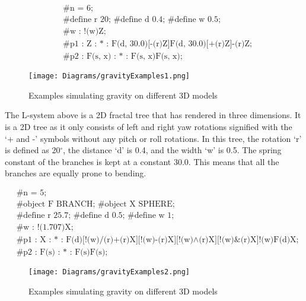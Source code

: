 \begin{singlespace}
\begin{equation}
\begin{aligned}
	&\textrm{\#n = 6;} \\
	&\textrm{\#define r 20; \#define d 0.4; \#define w 0.5;}\\
	&\textrm{\#w : !(w)Z;}\\
	&\textrm{\#p1 : Z : * : F(d, 30.0)[-(r)Z]F(d, 30.0)[+(r)Z]-(r)Z;}\\
	&\textrm{\#p2 : F(s, x) : * : F(s, x)F(s, x);}
\end{aligned}
\end{equation}
\end{singlespace}

\begin{figure}[htbp]
	{\centering
		\vspace{7px}
		\texttt{[image: Diagrams/gravityExamples1.png]}
		\label{3DAxisFigure} \label{Gravity applied to generated models}
		\caption{Examples simulating gravity on different 3D models}
	}
\end{figure}
\FloatBarrier

The L-system above is a 2D fractal tree that has rendered in three dimensions. It is a 2D tree as it only consists of left and right yaw rotations signified with the `+ and -' symbols without any pitch or roll rotations. In this tree, the rotation `r' is defined as 20$^{\circ}$, the distance `d' is 0.4, and the width `w' is 0.5. The spring constant of the branches is kept at a constant 30.0. This means that all the branches are equally prone to bending. 

\begin{singlespace}
\begin{equation}
\begin{aligned}
	&\textrm{\#n = 5;} \\
	&\textrm{\#object F BRANCH; \#object X SPHERE;}\\
	&\textrm{\#define r 25.7; \#define d 0.5; \#define w 1;}\\
	&\textrm{\#w : !(1.707)X;}\\
	&\textrm{\#p1 : X : * : F(d)[!(w)/(r)+(r)X][!(w)-(r)X][!(w)$\land$(r)X][!(w)\&(r)X]!(w)F(d)X;}\\
	&\textrm{\#p2 : F(s) : * : F(s)F(s);}
\end{aligned}
\end{equation}
\end{singlespace}

\begin{figure}[htbp]
	{\centering
		\vspace{7px}
		\texttt{[image: Diagrams/gravityExamples2.png]}
		\label{3DAxisFigure} \label{Gravity applied to generated models}
		\caption{Examples simulating gravity on different 3D models}
	}
\end{figure}
\FloatBarrier

